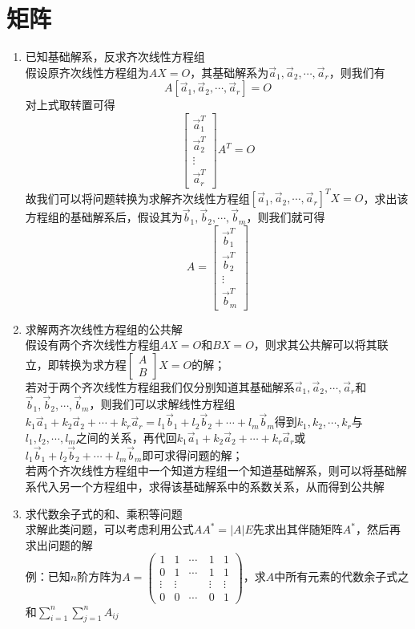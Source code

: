 \documentclass[12pt,a4paper,UTF8]{book}
\begin{document}
\section{矩阵}
\begin{enumerate}
\item 已知基础解系，反求齐次线性方程组\\
假设原齐次线性方程组为$AX=O$，其基础解系为$\vec{a}_1,\vec{a}_2,\cdots,\vec{a}_r$，则我们有
\[A\left[\vec{a}_1,\vec{a}_2,\cdots,\vec{a}_r\right]=O\]
对上式取转置可得
\[\begin{bmatrix}\vec{a}_1^T\\\vec{a}_2^T\\\vdots\\\vec{a}_r^T\end{bmatrix}A^T=O\]
故我们可以将问题转换为求解齐次线性方程组$\left[\vec{a}_1,\vec{a}_2,\cdots,\vec{a}_r\right]^TX=O$，求出该方程组的基础解系后，假设其为$\vec{b}_1,\vec{b}_2,\cdots,\vec{b}_m$，则我们就可得
\[A=\begin{bmatrix}\vec{b}_1^T\\\vec{b}_2^T\\\vdots\\\vec{b}_m^T\end{bmatrix}\]
\item 求解两齐次线性方程组的公共解\\
假设有两个齐次线性方程组$AX=O$和$BX=O$，则求其公共解可以将其联立，即转换为求方程$\begin{bmatrix}A\\B\end{bmatrix}X=O$的解；\\
若对于两个齐次线性方程组我们仅分别知道其基础解系$\vec{a}_1,\vec{a}_2,\cdots,\vec{a}_r$和$\vec{b}_1,\vec{b}_2,\cdots,\vec{b}_m$，则我们可以求解线性方程组$k_1\vec{a}_1+k_2\vec{a}_2+\cdots+k_r\vec{a}_r=l_1\vec{b}_1+l_2\vec{b}_2+\cdots+l_m\vec{b}_m$得到$k_1,k_2,\cdots,k_r$与$l_1,l_2,\cdots,l_m$之间的关系，再代回$k_1\vec{a}_1+k_2\vec{a}_2+\cdots+k_r\vec{a}_r$或$l_1\vec{b}_1+l_2\vec{b}_2+\cdots+l_m\vec{b}_m$即可求得问题的解；\\
若两个齐次线性方程组中一个知道方程组一个知道基础解系，则可以将基础解系代入另一个方程组中，求得该基础解系中的系数关系，从而得到公共解
\item 求代数余子式的和、乘积等问题\\
求解此类问题，可以考虑利用公式$AA^*=\left|A\right|E$先求出其伴随矩阵$A^*$，然后再求出问题的解\\
例：已知$n$阶方阵为$A=\begin{pmatrix}1&1&\cdots&1&1\\0&1&\cdots&1&1\\\vdots&\vdots&\quad&\vdots&\vdots\\0&0&\cdots&0&1\end{pmatrix}$，求$A$中所有元素的代数余子式之和$\sum\limits_{i=1}^n\sum\limits_{j=1}^nA_{ij}$\\

\end{enumerate}
\end{document}
